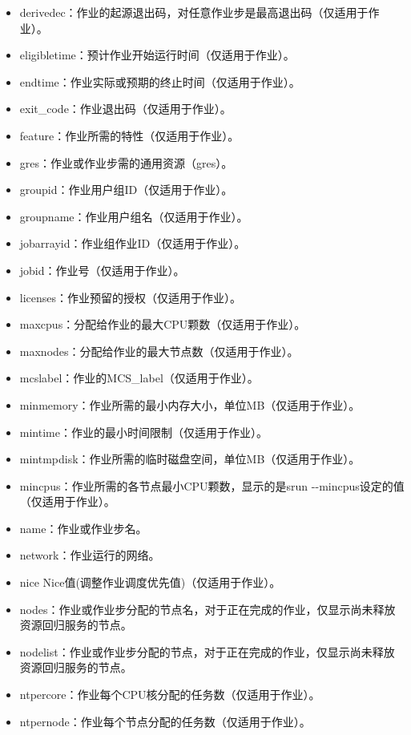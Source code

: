 \begin{itemize}
\begin{itemize}
\begin{itemize}
    \item derivedec：作业的起源退出码，对任意作业步是最高退出码（仅适用于作业）。
    \item eligibletime：预计作业开始运行时间（仅适用于作业）。
    \item endtime：作业实际或预期的终止时间（仅适用于作业）。
    \item exit\_code：作业退出码（仅适用于作业）。
    \item feature：作业所需的特性（仅适用于作业）。
    \item gres：作业或作业步需的通用资源（gres）。
    \item groupid：作业用户组ID（仅适用于作业）。
    \item groupname：作业用户组名（仅适用于作业）。
    \item jobarrayid：作业组作业ID（仅适用于作业）。
    \item jobid：作业号（仅适用于作业）。
    \item licenses：作业预留的授权（仅适用于作业）。
    \item maxcpus：分配给作业的最大CPU颗数（仅适用于作业）。
    \item maxnodes：分配给作业的最大节点数（仅适用于作业）。
    \item mcslabel：作业的MCS\_label（仅适用于作业）。
    \item minmemory：作业所需的最小内存大小，单位MB（仅适用于作业）。
    \item mintime：作业的最小时间限制（仅适用于作业）。
    \item mintmpdisk：作业所需的临时磁盘空间，单位MB（仅适用于作业）。
    \item mincpus：作业所需的各节点最小CPU颗数，显示的是srun -{}-mincpus设定的值（仅适用于作业）。
    \item name：作业或作业步名。
    \item network：作业运行的网络。
    \item nice Nice值(调整作业调度优先值)（仅适用于作业）。
    \item nodes：作业或作业步分配的节点名，对于正在完成的作业，仅显示尚未释放资源回归服务的节点。
    \item nodelist：作业或作业步分配的节点，对于正在完成的作业，仅显示尚未释放资源回归服务的节点。
    \item ntpercore：作业每个CPU核分配的任务数（仅适用于作业）。
    \item ntpernode：作业每个节点分配的任务数（仅适用于作业）。

\end{itemize}
\end{itemize}
\end{itemize}
